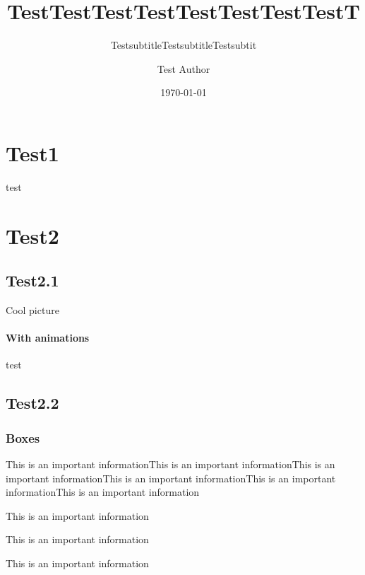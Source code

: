 \documentclass[aspectratio=169]{beamer}
\title{TestTestTestTestTestTestTestTestT}
\subtitle{TestsubtitleTestsubtitleTestsubtit}
\author{Test Author}
\date{\today}
\begin{document}

\begin{frame}
    \titlepage
\end{frame}

\section{Test1}

\begin{frame}[fragile]
    test
\end{frame}

\section{Test2}

\subsection{Test2.1}

\begin{frame}[fragile]{Cool picture}
    \framesubtitle{With animations}
    test
\end{frame}

\subsection{Test2.2}
\begin{frame}[fragile]
    \frametitle{Boxes}
    \begin{block}
        This is an important informationThis is an important informationThis is an important informationThis is an important informationThis is an important informationThis is an important information
    \end{block}
    \begin{definition}[de]
        This is an important information
    \end{definition}
    \begin{examples}[ex]
        This is an important information
    \end{examples}
    \begin{alertblock}[al]
        This is an important information
    \end{alertblock}
\end{frame}
\end{document}
